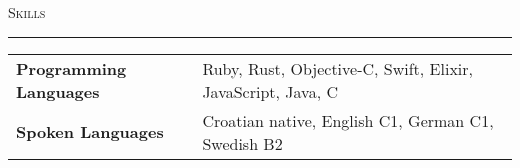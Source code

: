 \documentclass[10pt, a4paper, final, onecolumn, oneside, notitlepage]{article}
\newcommand{\sectionspacing}[0]{ \vspace{10pt} } %
\newcommand{\sectionrule}[0]{ \rule[6pt]{\textwidth}{0.5pt} } %
\renewcommand{\section}[1]{\sectionspacing {\large \scshape #1} \sectionrule}
\begin{document}
\begin{center}

\section{Skills}
\begin{tabular}{ >{\hfill}p{} p{} }
\textbf{Programming Languages} & Ruby, Rust, Objective-C, Swift, Elixir,
JavaScript, Java, C \\
\textbf{Spoken Languages} & Croatian native, English C1, German C1,
Swedish B2 \\
\end{tabular}

\end{center}
\end{document}
